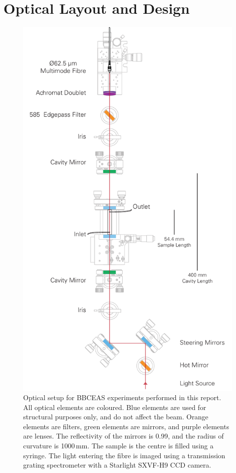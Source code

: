 \section{Optical Layout and Design}\label{sec:optical_layout}

\begin{figure}
\begin{center}
\includegraphics[]{figures/bbceas_setup/bbceas_setup_vertical.pdf}
\end{center}
\caption[BBCEAS Setup]{Optical setup for \ac{BBCEAS} experiments performed in this report. All optical elements are coloured. Blue elements are used for structural purposes only, and do not affect the beam. Orange elements are filters, green elements are mirrors, and purple elements are lenses. The reflectivity of the mirrors is 0.99, and the radius of curvature is 1000\,mm. The sample is the centre is filled using a syringe. The light entering the fibre is imaged using a transmission grating spectrometer with a Starlight SXVF-H9 \ac{CCD} camera.}
\label{fig:optical_layout}
\end{figure}


